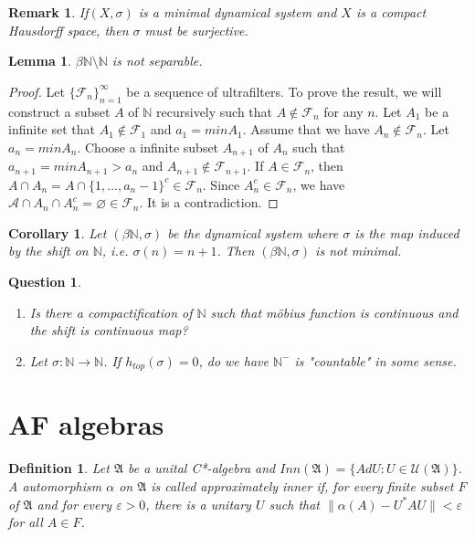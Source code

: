 \documentclass[a4paper,10pt]{amsart}
\newtheorem{corollary}{Corollary}[section]
\newtheorem{definition}{Definition}[section]
\newtheorem{lemma}{Lemma}[section]
\newtheorem{remark}{Remark}[section]
\newtheorem{question}{Question}[section]
\newcommand{\AAA}{\mathfrak A}
\newcommand{\FFF}{\mathcal F}
\newcommand{\A}{\mathcal{A}}
\newcommand{\N}{\mathbb N} %
\begin{document}
\begin{remark}
    If$(X, \sigma)$ is a minimal dynamical system and $X$ is a compact 
    Hausdorff space, then $\sigma$ must be surjective. 
\end{remark}

\begin{lemma}
   $\beta \N \setminus \N$ is not separable. 
\end{lemma}
\begin{proof}
    Let $\{\FFF_n \}_{n=1}^{\infty}$ be a sequence of ultrafilters.
    To prove the result, we will construct a subset $A$ of $\N$ 
    recursively such that $A \notin \FFF_n$ for any $n$.
    Let $A_1$ be a infinite set that $A_1 \notin \FFF_1$ and 
    $a_1 = min A_{1}$. Assume that we have $A_n \notin \FFF_n$.
    Let $a_n = min A_{n}$. Choose a infinite subset $A_{n+1}$ of $A_n$ 
    such that $a_{n+1} = min A_{n+1} > a_n$ and $A_{n+1} \notin \FFF_{n+1}$.
    If $A \in \FFF_n$, then $A \cap A_n = 
    A \cap \{1, \ldots, a_n-1\}^{c} \in \FFF_n$. 
    Since $A_{n}^{c} \in \FFF_n$, we have $\A \cap A_n 
    \cap A_{n}^{c} = \varnothing \in \FFF_n$. It is a contradiction.
\end{proof}

\begin{corollary}
   Let $(\beta \N, \sigma)$ be the dynamical system where $\sigma$ is
   the map induced by the shift on $\N$, i.e. $\sigma(n) = n+1$. Then
   $(\beta \N, \sigma)$ is not minimal.
\end{corollary}


\begin{question}
    \begin{enumerate}
        \item Is there a compactification of $\N$ such that 
        m\"{o}bius function is continuous and the shift is continuous map?
        \item Let $\sigma: \N \rightarrow \N$. If $h_{top}(\sigma) = 0$, do 
            we have $\N^{-}$ is "countable" in some sense.
    \end{enumerate}
\end{question}

\section{AF algebras}
\begin{definition}
    Let $\AAA$ be a unital C*-algebra and 
    $Inn(\AAA) = \{ Ad U : U \in \mathcal{U}(\AAA)\}$.
    A automorphism $\alpha$ on $\AAA$ is called approximately 
    inner if, for every finite subset $F$ of $\AAA$ and 
    for every $\varepsilon > 0$, there is a unitary $U$ such that
    $\| \alpha(A) - U^{*}AU \| < \varepsilon$ for all $A \in F$.
\end{definition}
\end{document}
